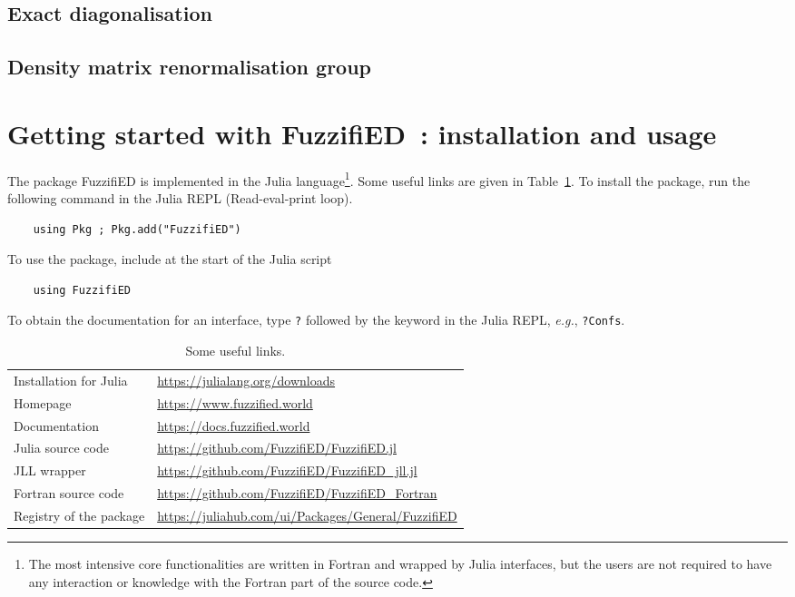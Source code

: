 \documentclass{timesjhep}
\begin{document}
\subsection{Exact diagonalisation}

\subsection{Density matrix renormalisation group}

\section{Getting started with FuzzifiED~: installation and usage}
\label{sec:usage}

The package FuzzifiED is implemented in the Julia language\footnote{The most intensive core functionalities are written in Fortran and wrapped by Julia interfaces, but the users are not required to have any interaction or knowledge with the Fortran part of the source code.}. Some useful links are given in Table~\ref{tbl:link}. To install the package, run the following command in the Julia REPL (Read-eval-print loop). 
\begin{lstlisting}
    using Pkg ; Pkg.add("FuzzifiED")
\end{lstlisting}
To use the package, include at the start of the Julia script
\begin{lstlisting}
    using FuzzifiED
\end{lstlisting}
To obtain the documentation for an interface, type \lstinline|?| followed by the keyword in the Julia REPL, \textit{e.g.}, \lstinline|?Confs|.

\begin{table}[htbp]
    \centering
    \begin{tabular}{l|l}
        \hline\hline
        Installation for Julia&\url{https://julialang.org/downloads}\\
        Homepage&\url{https://www.fuzzified.world}\\
        Documentation&\url{https://docs.fuzzified.world}\\
        Julia source code&\url{https://github.com/FuzzifiED/FuzzifiED.jl}\\
        JLL wrapper&\url{https://github.com/FuzzifiED/FuzzifiED_jll.jl}\\
        Fortran source code&\url{https://github.com/FuzzifiED/FuzzifiED_Fortran}\\
        Registry of the package&\url{https://juliahub.com/ui/Packages/General/FuzzifiED}\\
        \hline\hline
    \end{tabular}
    \caption{Some useful links.}
    \label{tbl:link}
\end{table}
\end{document}
